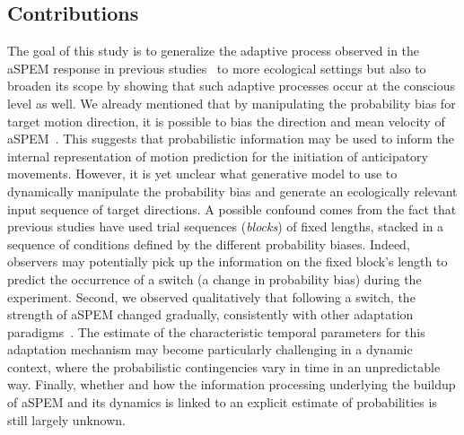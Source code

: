 \documentclass[12pt,english]{article}%
\newcommand{\citep}[1]{\parencite{#1}}
\newcommand{\seeSec}[1]{Section~\ref{sec:#1}}
\begin{document}
\subsection{Contributions}%
The goal of this study is to generalize the adaptive process
observed in the aSPEM response in previous studies~\citep{Montagnini2010,SantosKowler2017} to more ecological settings but
also to broaden its scope by showing that such adaptive processes
occur at the conscious level as well.
We already mentioned that by manipulating the probability bias for target motion direction,
it is possible to bias the direction and mean velocity of aSPEM~\citep{Montagnini2010}.
This suggests that probabilistic information may be used
to inform the internal representation of motion prediction
for the initiation of anticipatory movements.
However, it is yet unclear what generative model to use
to dynamically manipulate the probability bias
and generate an ecologically relevant input sequence of target directions.
A possible confound comes from the fact that
previous studies have used trial sequences (\textit{blocks}) of fixed lengths,
stacked in a sequence of conditions defined by the different probability biases.
Indeed, observers may potentially pick up
the information on the fixed block's length
to predict the occurrence of a switch (a change in probability bias) during the experiment.
Second, we observed qualitatively that following a switch,
the strength of aSPEM changed gradually,
consistently with other adaptation paradigms~\citep{Fukushima1996,Kahlon1996,Souto13}.
The estimate of the characteristic temporal parameters for this  adaptation mechanism
may become particularly challenging in a dynamic context,
where the probabilistic contingencies vary in time in an unpredictable way.
Finally, whether and how the information processing underlying
the buildup of aSPEM and its dynamics is linked to
an explicit estimate of probabilities is still largely unknown.
\end{document}
